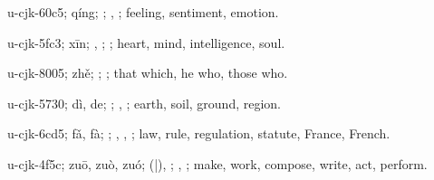 \begin{multicols}{2}
{\cjkgGlue{}u-cjk-60c5; qíng; \cjkgGlue{}\cjkgGlue{}\cjkgGlue{}; \cjkgGlue{}, \cjkgGlue{}; feeling, sentiment, emotion.

\cjkgGlue{}u-cjk-5fc3; xīn; \cjkgGlue{}, \cjkgGlue{}; \cjkgGlue{}; heart, mind, intelligence, soul.

\cjkgGlue{}u-cjk-8005; zhě; \cjkgGlue{}; \cjkgGlue{}; that which, he who, those who.

\cjkgGlue{}u-cjk-5730; dì, de; \cjkgGlue{}; \cjkgGlue{}, \cjkgGlue{}; earth, soil, ground, region.

\cjkgGlue{}u-cjk-6cd5; fǎ, fà; \cjkgGlue{}; \cjkgGlue{}, \cjkgGlue{}, \cjkgGlue{}; law, rule, regulation, statute, France, French.

\cjkgGlue{}u-cjk-4f5c; zuō, zuò, zuó; \cjkgGlue{}\cjkgGlue{}(\cjkgGlue{}|\cjkgGlue{}), \cjkgGlue{}\cjkgGlue{}\cjkgGlue{}; \cjkgGlue{}, \cjkgGlue{}; make, work, compose, write, act, perform.

}
\end{multicols}
